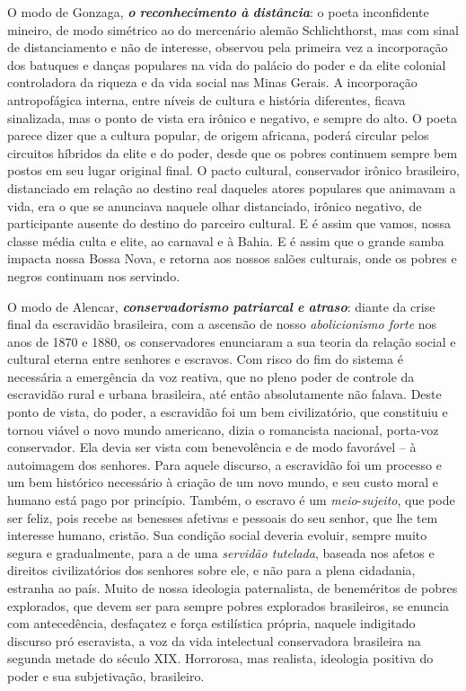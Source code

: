 O modo de Gonzaga, \emph{\textbf{o} \textbf{reconhecimento} \textbf{à}
\textbf{distância}}: o poeta inconfidente mineiro, de modo simétrico ao
do mercenário alemão Schlichthorst, mas com sinal de distanciamento e
não de interesse, observou pela primeira vez a incorporação dos batuques
e danças populares na vida do palácio do poder e da elite colonial
controladora da riqueza e da vida social nas Minas Gerais. A
incorporação antropofágica interna, entre níveis de cultura e história
diferentes, ficava sinalizada, mas o ponto de vista era irônico e
negativo, e sempre do alto. O poeta parece dizer que a cultura popular,
de origem africana, poderá circular pelos circuitos híbridos da elite e
do poder, desde que os pobres continuem sempre bem postos em seu lugar
original final. O pacto cultural, conservador irônico brasileiro,
distanciado em relação ao destino real daqueles atores populares que
animavam a vida, era o que se anunciava naquele olhar distanciado,
irônico negativo, de participante ausente do destino do parceiro
cultural. E é assim que vamos, nossa classe média culta e elite, ao
carnaval e à Bahia. E é assim que o grande samba impacta nossa Bossa
Nova, e retorna aos nossos salões culturais, onde os pobres e negros
continuam nos servindo.

O modo de Alencar, \emph{\textbf{conservadorismo} \textbf{patriarcal}
\textbf{e} \textbf{atraso}}: diante da crise final da escravidão
brasileira, com a ascensão de nosso \emph{abolicionismo forte} nos anos
de 1870 e 1880, os conservadores enunciaram a sua teoria da relação
social e cultural eterna entre senhores e escravos. Com risco do fim do
sistema é necessária a emergência da voz reativa, que no pleno poder de
controle da escravidão rural e urbana brasileira, até então
absolutamente não falava. Deste ponto de vista, do poder, a escravidão
foi um bem civilizatório, que constituiu e tornou viável o novo mundo
americano, dizia o romancista nacional, porta-voz conservador. Ela devia
ser vista com benevolência e de modo favorável -- à autoimagem dos
senhores. Para aquele discurso, a escravidão foi um processo e um bem
histórico necessário à criação de um novo mundo, e seu custo moral e
humano está pago por princípio. Também, o escravo é um
\emph{meio}-\emph{sujeito}, que pode ser feliz, pois recebe as benesses
afetivas e pessoais do seu senhor, que lhe tem interesse humano,
cristão. Sua condição social deveria evoluir, sempre muito segura e
gradualmente, para a de uma \emph{servidão tutelada}, baseada nos afetos
e direitos civilizatórios dos senhores sobre ele, e não para a plena
cidadania, estranha ao país. Muito de nossa ideologia paternalista, de
beneméritos de pobres explorados, que devem ser para sempre pobres
explorados brasileiros, se enuncia com antecedência, desfaçatez e força
estilística própria, naquele indigitado discurso pró escravista, a voz
da vida intelectual conservadora brasileira na segunda metade do século
XIX. Horrorosa, mas realista, ideologia positiva do poder e sua
subjetivação, brasileiro.

